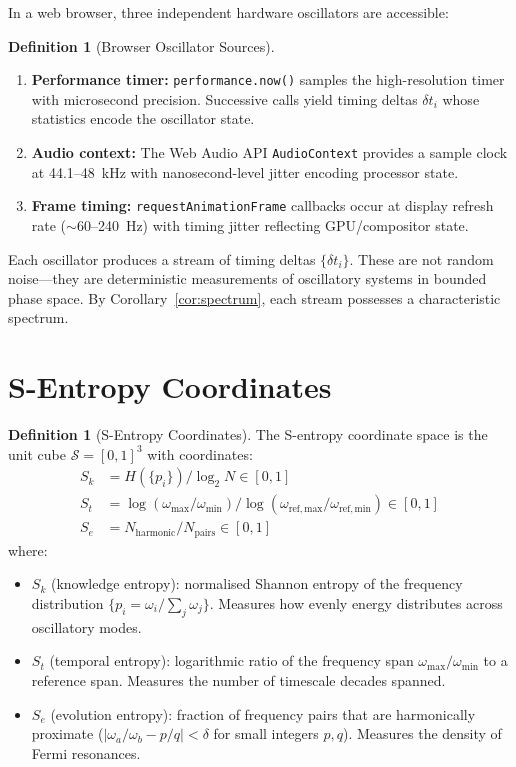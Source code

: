 \documentclass[twocolumn,10pt,a4paper]{article}
\theoremstyle{plain}
\theoremstyle{definition}
\newtheorem{definition}[theorem]{Definition}
\theoremstyle{remark}
\newcommand{\Sspace}{\mathcal{S}}
\newcommand{\Sk}{S_k}
\newcommand{\St}{S_t}
\newcommand{\Se}{S_e}
\begin{document}
In a web browser, three independent hardware oscillators are accessible:

\begin{definition}[Browser Oscillator Sources]
\label{def:oscillators}
\begin{enumerate}
    \item \textbf{Performance timer:} \texttt{performance.now()} samples the high-resolution timer with microsecond precision. Successive calls yield timing deltas $\delta t_i$ whose statistics encode the oscillator state.
    \item \textbf{Audio context:} The Web Audio API \texttt{AudioContext} provides a sample clock at 44.1--48~kHz with nanosecond-level jitter encoding processor state.
    \item \textbf{Frame timing:} \texttt{requestAnimationFrame} callbacks occur at display refresh rate ($\sim$60--240~Hz) with timing jitter reflecting GPU/compositor state.
\end{enumerate}
\end{definition}

Each oscillator produces a stream of timing deltas $\{\delta t_i\}$. These are not random noise---they are deterministic measurements of oscillatory systems in bounded phase space. By Corollary~\ref{cor:spectrum}, each stream possesses a characteristic spectrum.

\section{S-Entropy Coordinates}
\label{sec:s_coords}

\begin{definition}[S-Entropy Coordinates]
\label{def:s_coords}
The S-entropy coordinate space is the unit cube $\Sspace = [0,1]^3$ with coordinates:
\begin{align}
    \Sk &= H(\{p_i\}) / \log_2 N \in [0,1] \label{eq:sk} \\
    \St &= \log(\omega_{\max}/\omega_{\min}) / \log(\omega_{\mathrm{ref,max}}/\omega_{\mathrm{ref,min}}) \in [0,1] \label{eq:st} \\
    \Se &= N_{\mathrm{harmonic}} / N_{\mathrm{pairs}} \in [0,1] \label{eq:se}
\end{align}
where:
\begin{itemize}
    \item $\Sk$ (knowledge entropy): normalised Shannon entropy of the frequency distribution $\{p_i = \omega_i / \sum_j \omega_j\}$. Measures how evenly energy distributes across oscillatory modes.
    \item $\St$ (temporal entropy): logarithmic ratio of the frequency span $\omega_{\max}/\omega_{\min}$ to a reference span. Measures the number of timescale decades spanned.
    \item $\Se$ (evolution entropy): fraction of frequency pairs that are harmonically proximate ($|\omega_a/\omega_b - p/q| < \delta$ for small integers $p, q$). Measures the density of Fermi resonances.
\end{itemize}
\end{definition}
\end{document}
